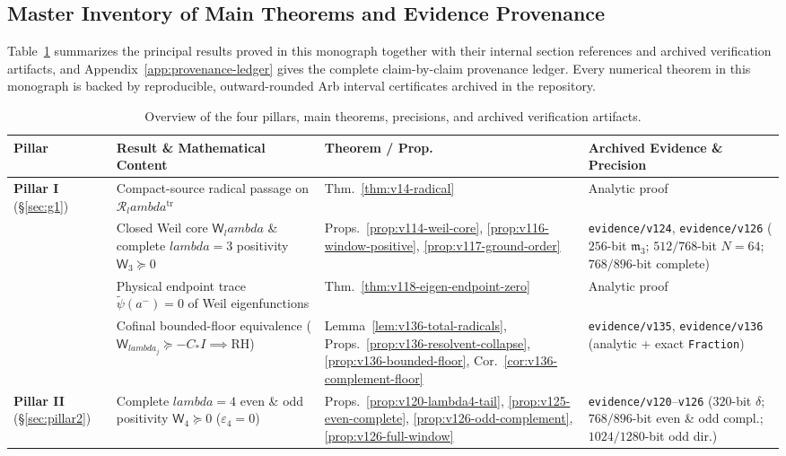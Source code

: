 \documentclass[11pt]{article}
\def\lambda{lambda}%
\theoremstyle{remark}
\begin{document}
\subsection{Master Inventory of Main Theorems and Evidence Provenance}
Table~\ref{tab:master-inventory} summarizes the principal results proved in this monograph together with their internal section references and archived verification artifacts, and Appendix~\ref{app:provenance-ledger} gives the complete claim-by-claim provenance ledger. Every numerical theorem in this monograph is backed by reproducible, outward-rounded Arb interval certificates archived in the repository.

\begin{table}[htbp]
\centering
\caption{Overview of the four pillars, main theorems, precisions, and archived verification artifacts.}
\label{tab:master-inventory}
\footnotesize
\begin{tabular}{>{\raggedright\arraybackslash}p{2.0cm}>{\raggedright\arraybackslash}p{5.2cm}>{\raggedright\arraybackslash}p{3.4cm}>{\raggedright\arraybackslash}p{3.9cm}}
\toprule
\textbf{Pillar} & \textbf{Result \& Mathematical Content} & \textbf{Theorem / Prop.} & \textbf{Archived Evidence \& Precision} \\
\midrule
\textbf{Pillar I} (\S\ref{sec:g1}) & Compact-source radical passage on $\mathcal R_\lambda^{\mathrm{tr}}$ & Thm.~\ref{thm:v14-radical} & Analytic proof \\
 & Closed Weil core $\mathsf W_\lambda$ \& complete $\lambda=3$ positivity $\mathsf W_3\succeq 0$ & Props.~\ref{prop:v114-weil-core}, \ref{prop:v116-window-positive}, \ref{prop:v117-ground-order} & \texttt{evidence/v124}, \texttt{evidence/v126} ($256$-bit $\mathfrak m_3$; $512/768$-bit $N=64$; $768/896$-bit complete) \\
 & Physical endpoint trace $\widetilde\psi(a^-)=0$ of Weil eigenfunctions & Thm.~\ref{thm:v118-eigen-endpoint-zero} & Analytic proof \\
 & Cofinal bounded-floor equivalence ($\mathsf W_{\lambda_j}\succeq -C_*I \implies \mathrm{RH}$) & Lemma~\ref{lem:v136-total-radicals}, Props.~\ref{prop:v136-resolvent-collapse}, \ref{prop:v136-bounded-floor}, Cor.~\ref{cor:v136-complement-floor} & \texttt{evidence/v135}, \texttt{evidence/v136} (analytic + exact \texttt{Fraction}) \\
\midrule
\textbf{Pillar II} (\S\ref{sec:pillar2}) & Complete $\lambda=4$ even \& odd positivity $\mathsf W_4\succeq 0$ ($\varepsilon_4=0$) & Props.~\ref{prop:v120-lambda4-tail}, \ref{prop:v125-even-complete}, \ref{prop:v126-odd-complement}, \ref{prop:v126-full-window} & \texttt{evidence/v120}--\texttt{v126} ($320$-bit $\delta$; $768/896$-bit even \& odd compl.; $1024/1280$-bit odd dir.) \\

\end{tabular}
\end{table}
\end{document}
